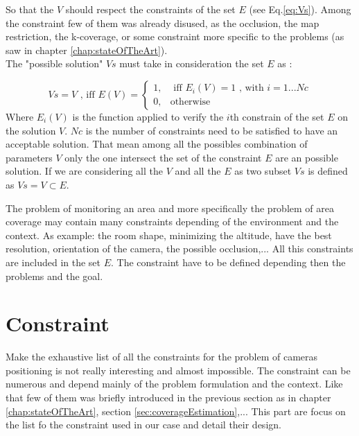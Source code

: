 So that the $V$ should respect the constraints of the set $E$ (see Eq.\ref{eq:Vs}). Among the constraint few of them was already disused, as the occlusion, the map restriction, the k-coverage, or some constraint more specific to the problems (as saw in chapter \ref{chap:stateOfTheArt}).\\
 The "possible solution" $Vs$ must take in consideration the set $E$ as :

\begin{equation}\label{eq:Vs}
Vs=V \mbox{ , iff } E(V)=\begin{cases}1, & \mbox{  iff } E_i(V)=1 \mbox{ , with } i=1...Nc \\ 0, & \mbox{otherwise} 
\end{cases} 
\end{equation}
Where $E_i(V)$ is the function applied to verify  the $i$th constrain of the set $E$ on the solution $V$. $Nc$ is the number of constraints need to be satisfied to have an acceptable solution.
That mean among all the possibles combination of parameters $V$ only the one intersect the set of the constraint $E$ are an possible solution.  If we are considering  all the $V$ and all the $E$ as two subset $Vs$ is defined as $Vs=V\subset E$. 

The problem of monitoring an area and more specifically the problem of area coverage may contain many constraints depending of the environment and the context. As example: the room shape, minimizing  the altitude,  have  the best resolution, orientation of the camera, the possible occlusion,... All this constraints are included in the set $E$. 
The constraint have to be defined depending then the problems and the goal.

\section{Constraint}\label{sec:constraint}

Make the exhaustive list of all the constraints for the problem of cameras positioning is not really interesting and almost impossible. The constraint can be numerous and depend mainly of the problem formulation and the context. Like that few of them was briefly introduced in the previous section as in chapter \ref{chap:stateOfTheArt}, section \ref{sec:coverageEstimation},... This part are focus on the list fo the constraint used in our case and detail their design.

